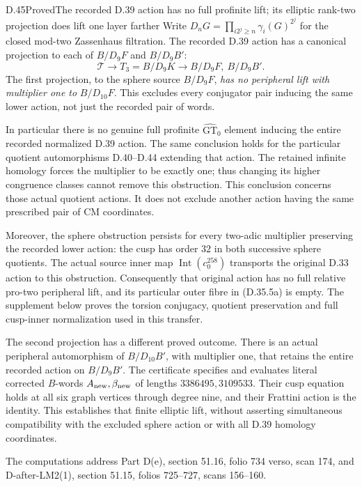 \begin{statement}{D.45}{Proved}{The recorded D.39 action has no full profinite lift; its elliptic rank-two projection does lift one layer farther}
Write \(D_nG=\prod_{i2^j\ge n}\gamma_i(G)^{2^j}\)
for the closed mod-two Zassenhaus filtration.
The recorded D.39 action has a canonical projection
to each of \(B/D_9F\) and \(B/D_9B'\):
\[
 \mathcal T\longrightarrow T_3=B/D_9K
                \longrightarrow B/D_9F,\ B/D_9B'.             \tag{D.45.7}
\]
The first projection, to the sphere source \(B/D_9F\),
\emph{has no peripheral lift with multiplier one to}
\(B/D_{10}F\). This excludes every conjugator pair
inducing the same lower action, not just the recorded
pair of words.

In particular there is no genuine full profinite
\(\widehat{\mathrm{GT}}_0\) element inducing the
entire recorded normalized D.39 action. The same
conclusion holds for the particular quotient
automorphisms D.40--D.44 extending that action.
The retained infinite homology forces the multiplier
to be exactly one; thus changing its higher
congruence classes cannot remove this obstruction.
This conclusion concerns those actual quotient
actions. It does not exclude another action
having the same prescribed pair of CM coordinates.

Moreover, the sphere obstruction persists for every two-adic
multiplier preserving the recorded lower action: the cusp has
order \(32\) in both successive sphere quotients. The actual
source inner map \(\operatorname{Int}(c_0^{258})\) transports
the original D.33 action to this obstruction. Consequently that
original action has no full relative pro-two peripheral lift,
and its particular outer fibre in (D.35.5a) is empty. The
supplement below proves the torsion conjugacy, quotient
preservation and full cusp-inner normalization used in this transfer.

The second projection has a different proved
outcome. There is an actual peripheral automorphism
of \(B/D_{10}B'\), with multiplier one, that retains
the entire recorded action on \(B/D_9B'\).
The certificate specifies and evaluates literal
corrected \(B\)-words \(A_{\rm new},\beta_{\rm new}\)
of lengths \(3386495,3109533\).
Their cusp equation holds at all six graph vertices
through degree nine, and their Frattini action is
the identity. This establishes that finite
elliptic lift, without asserting simultaneous
compatibility with the excluded sphere action or
with all D.39 homology coordinates.

The computations address Part D(e), section 51.16,
folio 734 verso, scan 174, and D-after-LM2(1),
section 51.15, folios 725--727, scans 156--160.
\end{statement}
